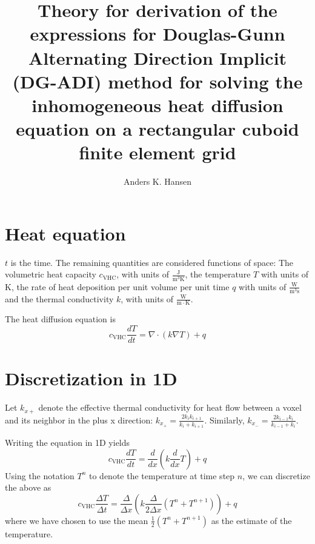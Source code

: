 \documentclass{scrartcl}
\title{Theory for derivation of the expressions for Douglas-Gunn Alternating Direction Implicit (DG-ADI) method for solving the inhomogeneous heat diffusion equation on a rectangular cuboid finite element grid}
\author{Anders K. Hansen}
\newcommand{\VHC}{c_\mathrm{VHC}}
\begin{document}
\maketitle

\section{Heat equation}
$t$ is the time. The remaining quantities are considered functions of space: The volumetric heat capacity $\VHC$, with units of $\mathrm{\frac J {m^3 K}}$, the temperature $T$ with units of $\mathrm K$, the rate of heat deposition per unit volume per unit time $q$ with units of $\mathrm{\frac W {m^3 s}}$ and the thermal conductivity $k$, with units of $\mathrm{\frac W {m \cdot K}}$.

The heat diffusion equation is
\begin{equation}
\VHC \frac{dT}{dt} = \nabla \cdot \left(k \nabla T\right) + q
\end{equation}

\section{Discretization in 1D}
Let $k_{x+}$ denote the effective thermal conductivity for heat flow between a voxel and its neighbor in the plus x direction: $k_{x_+} = \frac{2k_ik_{i+1}}{k_i + k_{i+1}}$. Similarly, $k_{x_-} = \frac{2k_{i-1}k_i}{k_{i-1} + k_i}$.

Writing the equation in 1D yields
\begin{equation}
\VHC \frac{dT}{dt} = \frac d {dx} \left( k \frac d {dx} T \right) + q
\end{equation}
Using the notation $T^n$ to denote the temperature at time step $n$, we can discretize the above as
\begin{equation}
\VHC \frac{\Delta T}{\Delta t} = \frac \Delta {\Delta x} \left( k \frac \Delta {2\Delta x} \left( T^n + T^{n+1} \right) \right) + q
\end{equation}
where we have chosen to use the mean $\frac 1 2 \left( T^n + T^{n+1} \right)$ as the estimate of the temperature.
\end{document}
